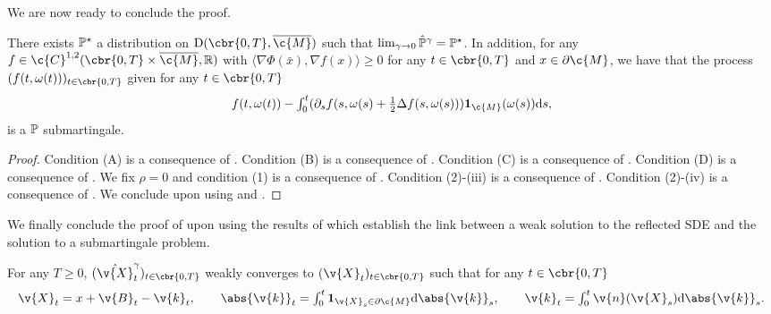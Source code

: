 We are now ready to conclude the proof.

\begin{theorem}
	\label{thm:martingale-problem}
	There exists $\bb{P}^\star$ a distribution on $\mathrm{D}(\cbr{0,T}, \cl{\c{M}})$ such that $\lim_{\gamma \to 0} \hat{\bb{P}}^\gamma = \bb{P}^\star$.
	In addition, for any $f \in \c{C}^{1,2}(\cbr{0,T} \times \cl{\c{M}}, \R)$ with $\langle \nabla \Phi(\bar{x}), \nabla f(x) \rangle \geq 0$ for any $t \in \cbr{0,T}$ and $x \in \partial \c{M}$, we have that the process $(f(t, \omega(t)))_{t \in \cbr{0,T}}$ given for any $t \in \cbr{0,T}$ \begin{equation} \textstyle f(t, \omega(t)) - \int_0^t (\partial_s f(s, \omega(s) + \tfrac{1}{2} \Delta f(s, \omega(s))) \bm{1}_{\c{M}}(\omega(s)) \mathrm{d} s , \end{equation} is a $\bb{P}$ submartingale.
\end{theorem}

\begin{proof}
	Condition (A) \cite[p.197]{stroock1971diffusion} is a consequence of .
	Condition (B) \cite[p.197]{stroock1971diffusion} is a consequence of .
	Condition (C) \cite[p.198]{stroock1971diffusion} is a consequence of .
	Condition (D) \cite[p.198]{stroock1971diffusion} is a consequence of .
	We fix $\rho =0$ and condition (1) \cite[p.203]{stroock1971diffusion} is a consequence of .
	Condition (2)-(iii) \cite[p.203]{stroock1971diffusion} is a consequence of .
	Condition (2)-(iv) \cite[p.203]{stroock1971diffusion} is a consequence of .
	We conclude upon using \cite[Theorem 6.3]{stroock1971diffusion} and \cite[Theorem 5.8]{stroock1971diffusion}.
\end{proof}

We finally conclude the proof of  upon using the results of \cite{kang2017submartingale} which establish the link between a weak solution to the reflected SDE and the solution to a submartingale problem.

\begin{theorem}
	\label{thm:subm-probl-weak}
	For any $T \geq 0$, $(\hat{\v{X}}_t^\gamma)_{t \in \cbr{0,T}}$ weakly converges to $(\v{X}_t)_{t \in \cbr{0,T}}$ such that for any $t \in \cbr{0,T}$ \begin{equation} \textstyle \v{X}_t = x + \v{B}_t - \v{k}_t , \qquad \abs{\v{k}}_t = \int_0^t \bm{1}_{\v{X}_s \in \partial \c{M}} \mathrm{d} \abs{\v{k}}_s , \qquad \v{k}_t = \int_0^t \v{n}(\v{X}_s) \mathrm{d} \abs{\v{k}}_s .
	\end{equation}
\end{theorem}


